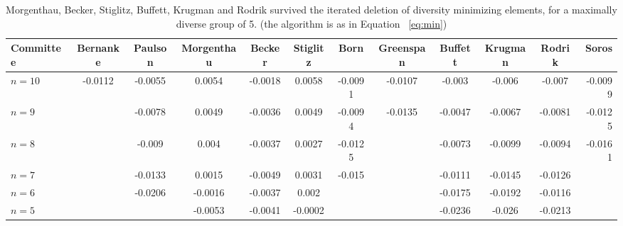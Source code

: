 \documentclass[12pt]{article}
\begin{document}
\begin{table}[h]\hspace*{-3.5cm}
\centering
\footnotesize
\begin{tabular}{l*{10}{c}r}
Committee &   Bernanke   &   Paulson   &   Morgenthau   &   Becker   &   Stiglitz   &   Born   &   Greenspan   &   Buffett   &   Krugman   &   Rodrik   &   Soros\\
\hline
$n=10$     & -0.0112 & -0.0055 & 0.0054 & -0.0018 & 0.0058 & -0.0091 & -0.0107 & -0.003  & -0.006  & -0.007  & -0.0099  \\
$n=9$      &         & -0.0078 & 0.0049 & -0.0036 & 0.0049 & -0.0094 & -0.0135 & -0.0047 & -0.0067 & -0.0081 & -0.0125\\
$n=8$      &         & -0.009  &  0.004 & -0.0037 & 0.0027 & -0.0125 &         & -0.0073 & -0.0099 & -0.0094 & -0.0161\\
$n=7$      &         & -0.0133 & 0.0015 & -0.0049 & 0.0031 & -0.015  &         & -0.0111 & -0.0145 & -0.0126 &        \\
$n=6$      &         & -0.0206 &-0.0016 & -0.0037 & 0.002  &         &         & -0.0175 & -0.0192 & -0.0116 &        \\
\hline
$n=5$      &         &         &-0.0053 & -0.0041 & -0.0002&         &         & -0.0236 & -0.026  & -0.0213 &        \\
\end{tabular} \hspace*{-3.5cm}
\caption{Morgenthau, Becker, Stiglitz, Buffett, Krugman and Rodrik survived the iterated deletion of diversity minimizing elements, for a maximally diverse group of 5. (the algorithm is as in Equation ~\ref{eq:min})} \label{table:minimize}
\end{table}
\end{document}

